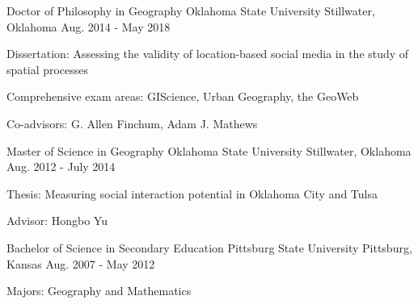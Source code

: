 

\begin{cventries}

  \cventry
  {Doctor of Philosophy in Geography} %
  {Oklahoma State University} %
  {Stillwater, Oklahoma} %
  {Aug. 2014 - May 2018} %
  {
    \begin{expitems} %
    \item {Dissertation: Assessing the validity of location-based social media
        in the study of spatial processes}
    \item {Comprehensive exam areas: GIScience, Urban Geography, the GeoWeb}
    \item {Co-advisors: G. Allen Finchum, Adam J. Mathews}
    \end{expitems}
  }

  \cventry
  {Master of Science in Geography} %
  {Oklahoma State University} %
  {Stillwater, Oklahoma} %
  {Aug. 2012 - July 2014} %
  {
    \begin{cvitems} %
    \item {Thesis: Measuring social interaction potential in Oklahoma City and Tulsa}
    \item {Advisor: Hongbo Yu}
    \end{cvitems}
  }

  \cventry
  {Bachelor of Science in Secondary Education} %
  {Pittsburg State University} %
  {Pittsburg, Kansas} %
  {Aug. 2007 - May 2012} %
  {
    \begin{cvitems} %
    \item {Majors: Geography and Mathematics}
    \end{cvitems}
  }
\end{cventries}
